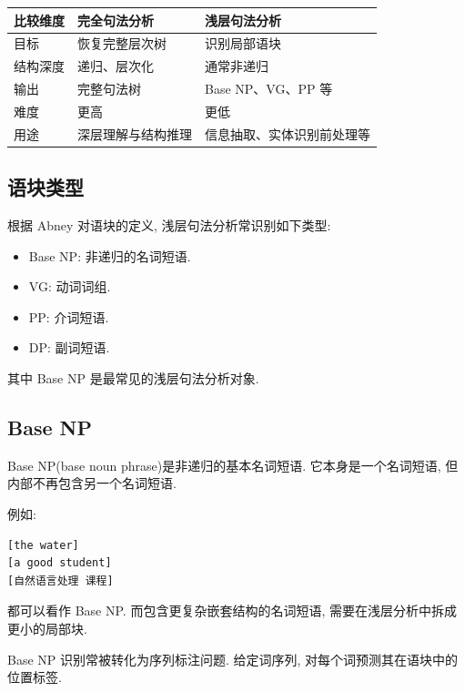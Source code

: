 \begin{table}[H]
\centering
\begingroup
\setlength{\tabcolsep}{2pt}
\small
\begin{tabular}{|p{}|p{}|p{}|}
\hline
比较维度 & 完全句法分析 & 浅层句法分析 \\ \hline
目标 & 恢复完整层次树 & 识别局部语块 \\ \hline
结构深度 & 递归、层次化 & 通常非递归 \\ \hline
输出 & 完整句法树 & Base NP、VG、PP 等 \\ \hline
难度 & 更高 & 更低 \\ \hline
用途 & 深层理解与结构推理 & 信息抽取、实体识别前处理等 \\ \hline
\end{tabular}
\endgroup
\end{table}

\subsection{语块类型}


根据 Abney 对语块的定义, 浅层句法分析常识别如下类型:

\begin{itemize}
\item Base NP: 非递归的名词短语.
\item VG: 动词词组.
\item PP: 介词短语.
\item DP: 副词短语.
\end{itemize}

其中 Base NP 是最常见的浅层句法分析对象.

\subsection{Base NP}


Base NP(base noun phrase)是非递归的基本名词短语.
它本身是一个名词短语, 但内部不再包含另一个名词短语.

例如:

\begin{Verbatim}[breaklines=true,breakanywhere=true,fontsize=\small]
[the water]
[a good student]
[自然语言处理 课程]
\end{Verbatim}

都可以看作 Base NP.
而包含更复杂嵌套结构的名词短语, 需要在浅层分析中拆成更小的局部块.

Base NP 识别常被转化为序列标注问题.
给定词序列, 对每个词预测其在语块中的位置标签.

